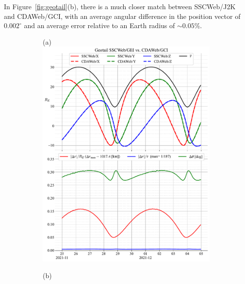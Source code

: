 \documentclass[draft]{agujournal2019}
\begin{document}
In Figure~\ref{fig:geotail}(b), there is a much closer match between SSCWeb/J2K and CDAWeb/GCI, with an average angular difference in the position vector of ~$0.002^\circ$ and an average error relative to an Earth radius of $\sim 0.05$\%.


\clearpage
\begin{figure}[h]
     \begin{subfigure}[b]{0.49\textwidth}
         (a)
         \centering
         \includegraphics[width=\textwidth]{figures/Geotail_SSCWeb-GEI_vs_CDAWeb-GCI.pdf}
     \end{subfigure}
     \begin{subfigure}[b]{0.49\textwidth}
         (b)
         \centering

\end{subfigure}
\end{figure}
\end{document}
